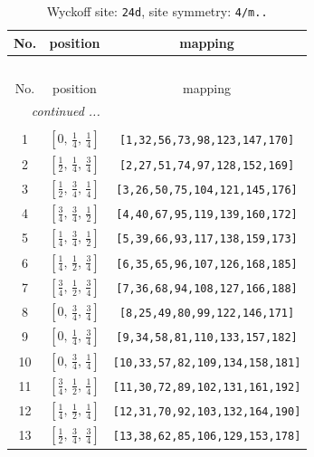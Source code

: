 \documentclass[fleqn,8pt]{jsarticle}
\begin{document}
\begin{longtable}{ccc}
\caption{Wyckoff site: {\tt 24d}, site symmetry: {\tt 4/m..}}
 \\
 \hline \hline
No. & position & mapping \\ \hline \endfirsthead

\multicolumn{2}{l}{\tablename\ \thetable{}} \\
 \hline \hline
No. & position & mapping \\ \hline \endhead

 \hline \hline
\multicolumn{2}{r}{\footnotesize\it continued ...} \\ \endfoot

 \hline \hline
\multicolumn{2}{r}{} \\ \endlastfoot

1 & $\left[ 0,\, \frac{1}{4},\, \frac{1}{4} \right]$ & {\tt [1,32,56,73,98,123,147,170]} \\ \hline
2 & $\left[ \frac{1}{2},\, \frac{1}{4},\, \frac{3}{4} \right]$ & {\tt [2,27,51,74,97,128,152,169]} \\ \hline
3 & $\left[ \frac{1}{2},\, \frac{3}{4},\, \frac{1}{4} \right]$ & {\tt [3,26,50,75,104,121,145,176]} \\ \hline
4 & $\left[ \frac{3}{4},\, \frac{3}{4},\, \frac{1}{2} \right]$ & {\tt [4,40,67,95,119,139,160,172]} \\ \hline
5 & $\left[ \frac{1}{4},\, \frac{3}{4},\, \frac{1}{2} \right]$ & {\tt [5,39,66,93,117,138,159,173]} \\ \hline
6 & $\left[ \frac{1}{4},\, \frac{1}{2},\, \frac{3}{4} \right]$ & {\tt [6,35,65,96,107,126,168,185]} \\ \hline
7 & $\left[ \frac{3}{4},\, \frac{1}{2},\, \frac{3}{4} \right]$ & {\tt [7,36,68,94,108,127,166,188]} \\ \hline
8 & $\left[ 0,\, \frac{3}{4},\, \frac{3}{4} \right]$ & {\tt [8,25,49,80,99,122,146,171]} \\ \hline
9 & $\left[ 0,\, \frac{1}{4},\, \frac{3}{4} \right]$ & {\tt [9,34,58,81,110,133,157,182]} \\ \hline
10 & $\left[ 0,\, \frac{3}{4},\, \frac{1}{4} \right]$ & {\tt [10,33,57,82,109,134,158,181]} \\ \hline
11 & $\left[ \frac{3}{4},\, \frac{1}{2},\, \frac{1}{4} \right]$ & {\tt [11,30,72,89,102,131,161,192]} \\ \hline
12 & $\left[ \frac{1}{4},\, \frac{1}{2},\, \frac{1}{4} \right]$ & {\tt [12,31,70,92,103,132,164,190]} \\ \hline
13 & $\left[ \frac{1}{2},\, \frac{3}{4},\, \frac{3}{4} \right]$ & {\tt [13,38,62,85,106,129,153,178]} \\ \hline

\end{longtable}
\end{document}
